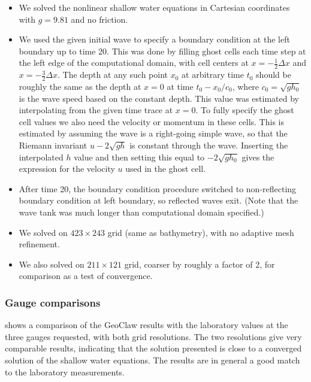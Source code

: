 \begin{itemize}
\item We solved the nonlinear shallow water equations in Cartesian
coordinates with $g=9.81$ and no friction.  
\item We used the given initial wave to specify a boundary condition at the left
boundary up to time 20.  This was done by filling ghost cells each time step
at the left edge of the computational domain, with cell centers at $x = -
\frac 1 2 \Delta x$ and $x = -\frac 3 2 \Delta x$.
The depth at any such point $x_0$ at arbitrary time $t_0$ should be roughly
the same as the depth at $x=0$ at time $t_0 - x_0/c_0$, where $c_0 =
\sqrt{gh_0}$ is the wave speed based on the constant depth.  This value was
estimated by 
interpolating from the given time trace at $x=0$.
To fully specify the ghost cell values we also need the velocity or momentum
in these cells.  This is estimated by assuming the wave is a right-going
simple wave, so that the Riemann invariant $u - 2\sqrt{gh}$ is constant
through the wave.  Inserting the interpolated $h$ value and then setting this
equal to $-2\sqrt{gh_0}$ gives the expression for the velocity $u$ used in
the ghost cell.

\item After time 20, the boundary condition procedure
switched to non-reflecting boundary condition 
at left boundary, so reflected waves exit.  
(Note that the wave tank was much longer than computational domain specified.)
\item We solved on $423\times 243$ grid (same as bathymetry), with no
adaptive mesh refinement.
\item We also solved on $211\times 121$ grid, coarser by roughly a factor of
2, for comparison as a test of convergence.
\end{itemize} 

\subsubsection{Gauge comparisons}

 shows a comparison of the GeoClaw results with the
laboratory values at the three gauges requested, with both grid resolutions. 
The two resolutions give very comparable results, indicating that the
solution presented is close to a converged solution of the shallow water
equations.  The results are in general a good match to the laboratory
measurements.

